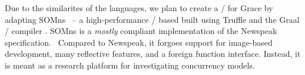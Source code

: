 Due to the similarites of the languages, we plan to create a \VM/ for Grace by adapting SOMns  ~-- a high-performance \VM/ based built using Truffle and the Graal \JITing/ compiler . SOMns is a \emph{mostly} compliant implementation of the Newspeak specification.\footnotemark~ Compared to Newspeak, it forgoes support for image-based development, many reflective features, and a foreign function interface. Instead, it is meant as a research platform for investigating concurrency models.




% 











% 
